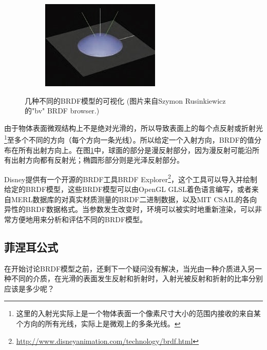 \begin{figure}
\begin{fullwidth}
\begin{center}
\begin{subfigure}[b]{0.328\thewidth}
	\end{subfigure}
	\begin{subfigure}[b]{0.328\thewidth}
		\includegraphics[width=1.\textwidth]{graphics/gi/ray-optics-8-6}
	\end{subfigure}
\caption{几种不同的BRDF模型的可视化 (图片来自Szymon Rusinkiewicz的"bv" BRDF browser.)}
\label{f:intro-brdf-models}
\end{center}
\end{fullwidth}
\end{figure}

由于物体表面微观结构上不是绝对光滑的，所以导致表面上的每个点反射或折射光\footnote{这里的入射光实际上是一个物体表面一个像素尺寸大小的范围内接收的来自某个方向的所有光线，实际上是微观上的多条光线。}至多个不同的方向（每个方向一条光线）。所以给定一个入射方向，BRDF的值分布在所有出射方向上。在图\ref{f:intro-brdf-models}中，球面的部分是漫反射部分，因为漫反射可能沿所有出射方向都有反射光；椭圆形部分则是光泽反射部分。

Disney提供有一个开源的BRDF工具BRDF Explorer\footnote{\url{http://www.disneyanimation.com/technology/brdf.html}}，这个工具可以导入并绘制给定的BRDF模型，这些BRDF模型可以由OpenGL GLSL着色语言编写，或者来自MERL数据库的对真实材质测量的BRDF二进制数据，以及MIT CSAIL的各向异性的BRDF数据格式。当参数发生改变时，环境可以被实时地重新渲染，可以非常方便地用来分析和评估不同的BRDF模型。





\subsection{菲涅耳公式}\label{sec:intro-fresnel}
在开始讨论BRDF模型之前，还剩下一个疑问没有解决，当光由一种介质进入另一种不同的介质，在光滑的表面发生反射和折射时，入射光被反射和折射的比率分别应该是多少呢？

